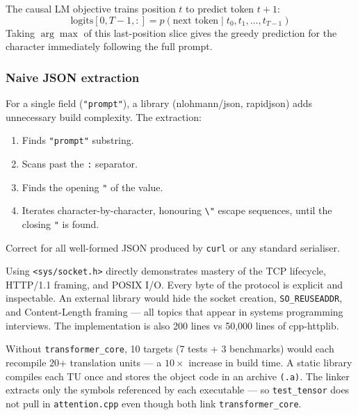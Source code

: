 \documentclass[12pt, a4paper]{article}
\begin{document}
The causal LM objective trains position $t$ to predict token $t+1$:
\[
  \text{logits}[0, T-1, :] = p(\text{next token} \mid t_0, t_1, \ldots, t_{T-1})
\]
Taking $\arg\max$ of this last-position slice gives the greedy prediction for
the character immediately following the full prompt.

\subsubsection{Naive JSON extraction}

For a single field (\texttt{"prompt"}), a library (nlohmann/json, rapidjson)
adds unnecessary build complexity.  The extraction:
\begin{enumerate}
  \item Finds \texttt{"prompt"} substring.
  \item Scans past the \texttt{:} separator.
  \item Finds the opening \texttt{"} of the value.
  \item Iterates character-by-character, honouring \texttt{\textbackslash"} escape sequences,
        until the closing \texttt{"} is found.
\end{enumerate}
Correct for all well-formed JSON produced by \texttt{curl} or any standard serialiser.

\begin{tcolorbox}[interviewbox,
    title={Interview: Why raw POSIX sockets instead of cpp-httplib?}]
  Using \texttt{<sys/socket.h>} directly demonstrates mastery of the TCP
  lifecycle, HTTP/1.1 framing, and POSIX I/O.  Every byte of the
  protocol is explicit and inspectable.  An external library would hide
  the socket creation, \texttt{SO\_REUSEADDR}, and Content-Length framing
  --- all topics that appear in systems programming interviews.  The
  implementation is also 200 lines vs 50,000 lines of cpp-httplib.
\end{tcolorbox}

\begin{tcolorbox}[interviewbox,
    title={Interview: Why static library instead of compiling sources per-target?}]
  Without \texttt{transformer\_core}, 10 targets (7 tests + 3 benchmarks)
  would each recompile 20+ translation units --- a $10\times$ increase in
  build time.  A static library compiles each TU once and stores the object
  code in an archive \texttt{(.a)}.  The linker extracts only the symbols
  referenced by each executable --- so \texttt{test\_tensor} does not pull in
  \texttt{attention.cpp} even though both link \texttt{transformer\_core}.
\end{tcolorbox}
\end{document}
